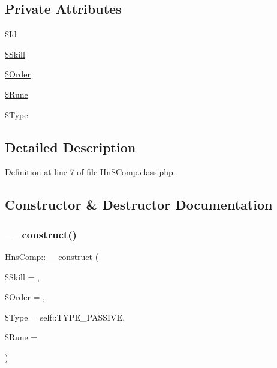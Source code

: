 \subsection*{Private Attributes}
\begin{DoxyCompactItemize}
\item 
\hyperlink{class_hns_comp_a65a74d79029aee0183c8a564b4bd6b32}{\$\+Id}
\item 
\hyperlink{class_hns_comp_a29d765b130798e33fd88cef7c4270ca2}{\$\+Skill}
\item 
\hyperlink{class_hns_comp_a80202d9abc9024329df1572c44992c90}{\$\+Order}
\item 
\hyperlink{class_hns_comp_a73142663ff5fd1fc7bbb5812ce7e5942}{\$\+Rune}
\item 
\hyperlink{class_hns_comp_a11198aafa3b785aa24597f17bb37c470}{\$\+Type}
\end{DoxyCompactItemize}


\subsection{Detailed Description}


Definition at line 7 of file Hn\+S\+Comp.\+class.\+php.



\subsection{Constructor \& Destructor Documentation}
\mbox{\label{class_hns_comp_a71919015da42681c27e434596d1a61ab}} 
\subsubsection{\texorpdfstring{\+\_\+\+\_\+construct()}{\_\_construct()}}
{\footnotesize\ttfamily Hns\+Comp\+::\+\_\+\+\_\+construct (\begin{DoxyParamCaption}\item[{}]{\$\+Skill = {\ttfamily \textquotesingle{}\textquotesingle{}},  }\item[{}]{\$\+Order = {\ttfamily \textquotesingle{}\textquotesingle{}},  }\item[{}]{\$\+Type = {\ttfamily self\+:\+:TYPE\+\_\+PASSIVE},  }\item[{}]{\$\+Rune = {\ttfamily \textquotesingle{}\textquotesingle{}} }\end{DoxyParamCaption})}



